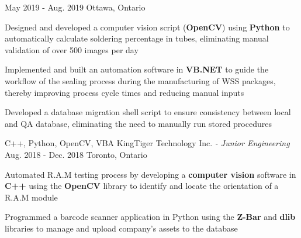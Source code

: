 \begin{siderules}
\begin{cventries}
      {May 2019 - Aug. 2019}
      {Ottawa, Ontario}
      {
        \begin{cvitems}
          \item {Designed and developed a computer vision script (\textbf{OpenCV}) using \textbf{Python} to automatically calculate soldering percentage in tubes, eliminating manual validation of over 500 images per day}
          \item {Implemented and built an automation software in \textbf{VB.NET} to guide the workflow of the sealing process during the manufacturing of WSS packages, thereby improving process cycle times and reducing manual inputs}
          \item {Developed a database migration shell script to ensure consistency between local and QA database, eliminating the need to manually run stored procedures}
        \end{cvitems}
      }
    \cventry
      {C++, Python, OpenCV, VBA}
      {KingTiger Technology Inc.\hspace{0.15em} \bodyfontlight\itshape{- Junior Engineering}}
      {Aug. 2018 - Dec. 2018}
      {Toronto, Ontario}
      {
        \begin{cvitems}
          \item {Automated R.A.M testing process by developing a \textbf{computer vision} software in \textbf{C++} using the \textbf{OpenCV} library to identify and locate the orientation of a R.A.M module}
          \item {Programmed a barcode scanner application in Python using the \textbf{Z-Bar} and \textbf{dlib} libraries to manage and upload company’s assets to the database}
        \end{cvitems}
      }
  \end{cventries}
\end{siderules}